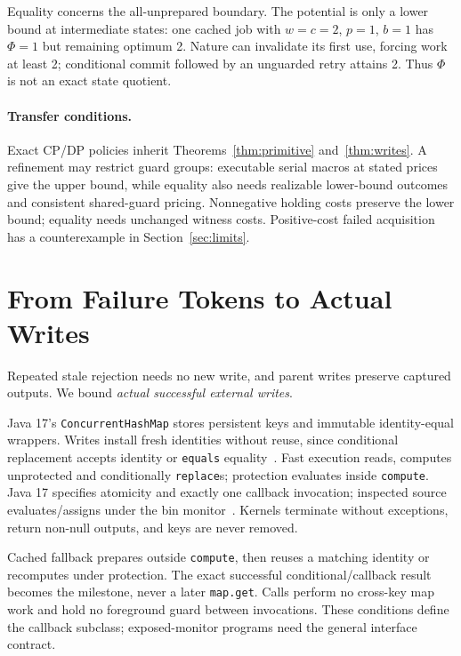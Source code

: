 \documentclass[acmsmall,screen,review,anonymous]{acmart}
\begin{document}
Equality concerns the all-unprepared boundary. The potential is only a lower bound at intermediate states: one cached job with $w=c=2$, $p=1$, $b=1$ has $\Phi=1$ but remaining optimum 2. Nature can invalidate its first use, forcing work at least 2; conditional commit followed by an unguarded retry attains 2. Thus $\Phi$ is not an exact state quotient.

\paragraph{Transfer conditions.}
Exact CP/DP policies inherit Theorems~\ref{thm:primitive} and~\ref{thm:writes}. A refinement may restrict guard groups: executable serial macros at stated prices give the upper bound, while equality also needs realizable lower-bound outcomes and consistent shared-guard pricing. Nonnegative holding costs preserve the lower bound; equality needs unchanged witness costs. Positive-cost failed acquisition has a counterexample in Section~\ref{sec:limits}.

\section{From Failure Tokens to Actual Writes}
\label{sec:java}

Repeated stale rejection needs no new write, and parent writes preserve captured outputs. We bound \emph{actual successful external writes}.

Java 17's \texttt{ConcurrentHashMap} stores persistent keys and immutable identity-equal wrappers. Writes install fresh identities without reuse, since conditional replacement accepts identity or \texttt{equals} equality~\cite{cmap17,chmsource17}. Fast execution reads, computes unprotected and conditionally \texttt{replace}s; protection evaluates inside \texttt{compute}. Java 17 specifies atomicity and exactly one callback invocation; inspected source evaluates/assigns under the bin monitor~\cite{chm17,chmsource17}. Kernels terminate without exceptions, return non-null outputs, and keys are never removed.

Cached fallback prepares outside \texttt{compute}, then reuses a matching identity or recomputes under protection. The exact successful conditional/callback result becomes the milestone, never a later \texttt{map.get}. Calls perform no cross-key map work and hold no foreground guard between invocations. These conditions define the callback subclass; exposed-monitor programs need the general interface contract.
\end{document}
